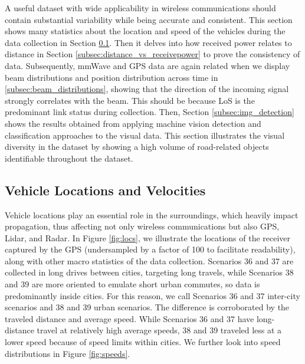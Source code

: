 \documentclass[10pt,comsoc]{IEEEtran}
\begin{document}
A useful dataset with wide applicability in wireless communications should contain substantial variability while being accurate and consistent. This section shows many statistics about the location and speed of the vehicles during the data collection in Section \ref{subsec:loc_and_vel}. Then it delves into how received power relates to distance in Section \ref{subsec:distance_vs_receivepower} to prove the consistency of data. Subsequently, mmWave and GPS data are again related when we display beam distributions and position distribution across time in \ref{subsec:beam_distributions}, showing that the direction of the incoming signal strongly correlates with the beam. This should be because LoS is the predominant link status during collection. Then, Section \ref{subsec:img_detection} shows the results obtained from applying machine vision detection and classification approaches to the visual data. This section illustrates the visual diversity in the dataset by showing a high volume of road-related objects identifiable throughout the dataset.

\subsection{Vehicle Locations and Velocities} \label{subsec:loc_and_vel}

Vehicle locations play an essential role in the surroundings, which heavily impact propagation, thus affecting not only wireless communications but also GPS, Lidar, and Radar. In Figure \ref{fig:locs}, we illustrate the locations of the receiver captured by the GPS (undersampled by a factor of 100 to facilitate readability), along with other macro statistics of the data collection. Scenarios 36 and 37 are collected in long drives between cities, targeting long travels, while Scenarios 38 and 39 are more oriented to emulate short urban commutes, so data is predominantly inside cities. For this reason, we call Scenarios 36 and 37 inter-city scenarios and 38 and 39 urban scenarios. The difference is corroborated by the traveled distance and average speed. While Scenarios 36 and 37 have long-distance travel at relatively high average speeds, 38 and 39 traveled less at a lower speed because of speed limits within cities. We further look into speed distributions in Figure \ref{fig:speeds}.
\end{document}
